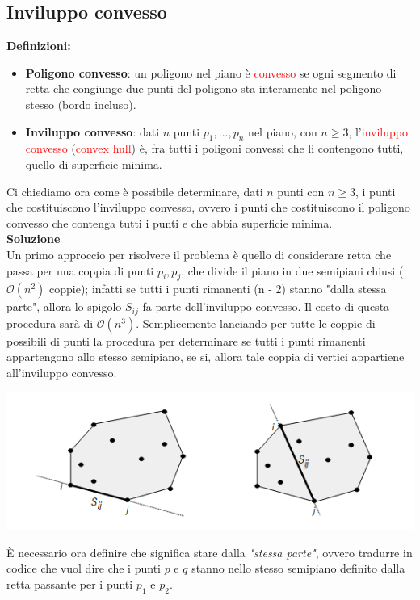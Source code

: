 \documentclass[../cheatSheetAlgoritmi.tex]{subfiles}
\begin{document}
\subsection{Inviluppo convesso}
\textbf{Definizioni:}
\begin{itemize}
	\item \textbf{Poligono convesso}: un poligono nel piano è \textcolor{red}{convesso} se ogni segmento di retta che congiunge due punti del poligono sta interamente nel poligono stesso (bordo incluso).
	\item \textbf{Inviluppo convesso}: dati $n$ punti $p_1, . . . , p_n$ nel piano, con $n \geq 3$, l'\textcolor{red}{inviluppo convesso} (\textcolor{red}{convex hull}) è, fra tutti i poligoni convessi che li contengono tutti, quello di superficie minima.
\end{itemize}
Ci chiediamo ora come è possibile determinare, dati $n$ punti con $n \geq 3$, i punti che costituiscono l'inviluppo convesso, ovvero i punti che costituiscono il poligono convesso che contenga tutti i punti e che abbia superficie minima. \\
\textbf{Soluzione} \\
Un primo approccio per risolvere il problema è quello di considerare retta che passa per una coppia di punti $p_i, p_j$, che divide il piano in due semipiani chiusi ($\mathcal{O}(n^2)$ coppie); infatti se tutti i punti rimanenti (n - 2) stanno "dalla stessa parte", allora lo spigolo $S_{ij}$ fa parte dell'inviluppo convesso. Il costo di questa procedura sarà di $\mathcal{O}(n^3)$. Semplicemente lanciando per tutte le coppie di possibili di punti la procedura per determinare se tutti i punti rimanenti appartengono allo stesso semipiano, se si, allora tale coppia di vertici appartiene all'inviluppo convesso.
\begin{center}
	\includegraphics{ ../img/backtracking_inviluppo_convesso}
\end{center}
È necessario ora definire che significa stare dalla \emph{"stessa parte"}, ovvero tradurre in codice che vuol dire che i punti $p$ e $q$ stanno nello stesso semipiano definito dalla retta passante per i punti $p_1$ e $p_2$. \\
\end{document}
